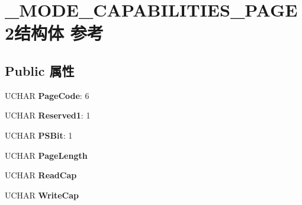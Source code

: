 \hypertarget{struct___m_o_d_e___c_a_p_a_b_i_l_i_t_i_e_s___p_a_g_e2}{}\section{\+\_\+\+M\+O\+D\+E\+\_\+\+C\+A\+P\+A\+B\+I\+L\+I\+T\+I\+E\+S\+\_\+\+P\+A\+G\+E2结构体 参考}
\label{struct___m_o_d_e___c_a_p_a_b_i_l_i_t_i_e_s___p_a_g_e2}
\subsection*{Public 属性}
\begin{DoxyCompactItemize}
\item 
\mbox{\label{struct___m_o_d_e___c_a_p_a_b_i_l_i_t_i_e_s___p_a_g_e2_a06c83c6dcb8bef64a4be3a8187b76619}} 
U\+C\+H\+AR {\bfseries Page\+Code}\+: 6
\item 
\mbox{\label{struct___m_o_d_e___c_a_p_a_b_i_l_i_t_i_e_s___p_a_g_e2_a5439f6a9370cce5aeb7e0114d5256bd9}} 
U\+C\+H\+AR {\bfseries Reserved1}\+: 1
\item 
\mbox{\label{struct___m_o_d_e___c_a_p_a_b_i_l_i_t_i_e_s___p_a_g_e2_a2b9e06a2a9881059bc8537f38d3527bc}} 
U\+C\+H\+AR {\bfseries P\+S\+Bit}\+: 1
\item 
\mbox{\label{struct___m_o_d_e___c_a_p_a_b_i_l_i_t_i_e_s___p_a_g_e2_a4f1d4d321e3bc25727c4a2aaa9405d36}} 
U\+C\+H\+AR {\bfseries Page\+Length}
\item 
\mbox{\label{struct___m_o_d_e___c_a_p_a_b_i_l_i_t_i_e_s___p_a_g_e2_a121c9c21bb916f8a3a2461012c5ea321}} 
U\+C\+H\+AR {\bfseries Read\+Cap}
\item 
\mbox{\label{struct___m_o_d_e___c_a_p_a_b_i_l_i_t_i_e_s___p_a_g_e2_a53f851808d1690bdcf1e27510d9c26ea}} 
U\+C\+H\+AR {\bfseries Write\+Cap}
\item 
\mbox{\label{struct___m_o_d_e___c_a_p_a_b_i_l_i_t_i_e_s___p_a_g_e2_abb7a6eacfcd2e3a3ce644593178ccea1}} 

\end{DoxyCompactItemize}
